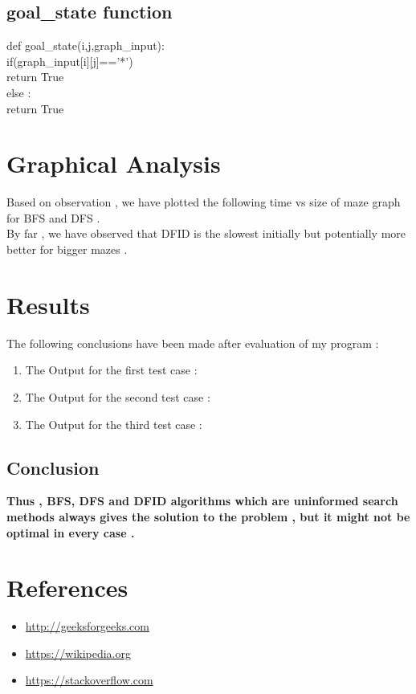 \documentclass{article}
\begin{document}
\subsection*{goal\_state function}
    \vspace{5pt}
    def goal\_state(i,j,graph\_input):
    \vspace{5pt}
        \\ \hspace*{20pt}if(graph\_input[i][j]=='*')
        \vspace{5pt}
        \\ \hspace*{30pt} return True
        \vspace{2pt}
        \\ \hspace*{20pt}else :
        \vspace{5pt}
        \\ \hspace*{30pt} return True
\newpage
\section{Graphical Analysis}
\vspace{5pt}
Based on observation , we have plotted the following time vs size of maze graph for BFS and DFS .
\vspace{20pt}
\\By far , we have observed that DFID is the slowest initially but potentially more better for bigger mazes .
\newpage
\section{Results}
\vspace{20pt}
The following conclusions have been made after evaluation of my program : 
\begin{enumerate}
    \item The Output for the first test case :
    \item The Output for the second test case :
    \item The Output for the third test case :
\end{enumerate}
\vspace{20pt}
\subsection*{Conclusion}
\textbf{Thus , BFS, DFS and DFID algorithms which are uninformed search methods always gives the solution to the problem , but it might not be optimal in every case .}
\newpage
\section{References}
\vspace{30pt}
\begin{itemize}
    \item \url{http://geeksforgeeks.com}
    \item \url{https://wikipedia.org}
    \item \url{https://stackoverflow.com}
\end{itemize}
\end{document}
